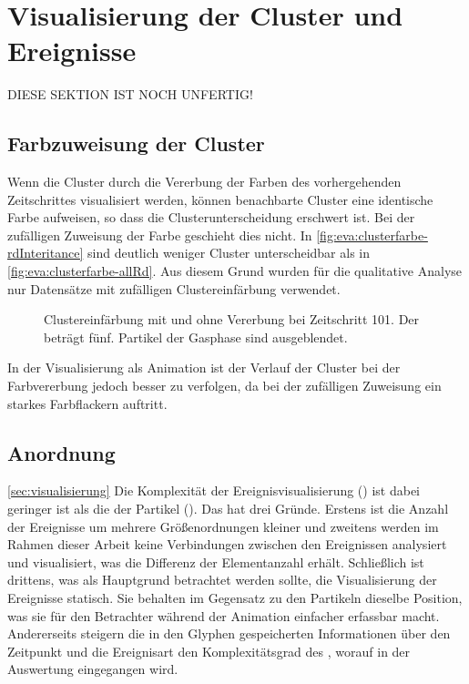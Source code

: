\section{Visualisierung der Cluster und Ereignisse}

DIESE SEKTION IST NOCH UNFERTIG!

\subsection*{Farbzuweisung der Cluster}
Wenn die Cluster durch die Vererbung der Farben des vorhergehenden Zeitschrittes visualisiert werden, können benachbarte Cluster eine identische Farbe aufweisen, so dass die Clusterunterscheidung erschwert ist. Bei der zufälligen Zuweisung der Farbe geschieht dies nicht. In \autoref{fig:eva:clusterfarbe-rdInteritance} sind deutlich weniger Cluster unterscheidbar als in \autoref{fig:eva:clusterfarbe-allRd}. Aus diesem Grund wurden für die qualitative Analyse nur Datensätze mit zufälligen Clustereinfärbung verwendet.

\begin{figure}
	{\caption{Clustereinfärbung mit und ohne Vererbung bei Zeitschritt 101. Der  beträgt fünf. Partikel der Gasphase sind ausgeblendet.}\label{fig:eva:clusterfarbe}}
\end{figure}

In der Visualisierung als Animation ist der Verlauf der Cluster bei der Farbvererbung jedoch besser zu verfolgen, da bei der zufälligen Zuweisung ein starkes Farbflackern auftritt.

\subsection*{Anordnung}

\autoref{sec:visualisierung}
Die Komplexität der Ereignisvisualisierung () ist dabei geringer ist als die der Partikel (). Das hat drei Gründe. Erstens ist die Anzahl der Ereignisse um mehrere Größenordnungen kleiner und zweitens werden im Rahmen dieser Arbeit keine Verbindungen zwischen den Ereignissen analysiert und visualisiert, was die Differenz der Elementanzahl erhält. Schließlich ist drittens, was als Hauptgrund betrachtet werden sollte, die Visualisierung der Ereignisse statisch. Sie behalten im Gegensatz zu den Partikeln dieselbe Position, was sie für den Betrachter während der Animation einfacher erfassbar macht.
Andererseits steigern die in den Glyphen gespeicherten Informationen über den Zeitpunkt und die Ereignisart den Komplexitätsgrad des , worauf in der Auswertung eingegangen wird.


